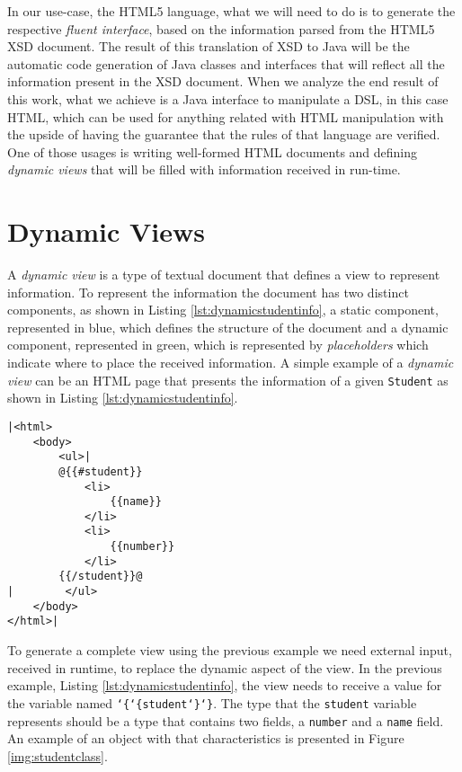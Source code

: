 \noindent
In our use-case, the \ac{HTML}5 language, what we will need to do is to generate the respective \textit{fluent interface}, based on the information parsed from the \ac{HTML}5 \ac{XSD} document. The result of this translation of \ac{XSD} to Java will be the automatic code generation of Java classes and interfaces that will reflect all the information present in the \ac{XSD} document. When we analyze the end result of this work, what we achieve is a Java interface to manipulate a \ac{DSL}, in this case \ac{HTML}, which can be used for anything related with \ac{HTML} manipulation with the upside of having the guarantee that the rules of that language are verified. One of those usages is writing well-formed \ac{HTML} documents and defining \textit{dynamic views} that will be filled with information received in run-time.

\section{Dynamic Views}

A \textit{dynamic view} is a type of textual document that defines a view to represent information. To represent the information the document has two distinct components, as shown in Listing \ref{lst:dynamicstudentinfo}, a {\color{blue}static component}, represented in blue, which defines the structure of the document and a {\color{green}dynamic component}, represented in green, which is represented by \textit{placeholders} which indicate where to place the received information. A simple example of a \textit{dynamic view} can be an \ac{HTML} page that presents the information of a given \texttt{Student} as shown in Listing \ref{lst:dynamicstudentinfo}. 

\bigskip

\begin{minipage}{\linewidth}
\begin{lstlisting}[caption={Dynamic Student Info - Using Mustache Template Engine}, label={lst:dynamicstudentinfo}, style=dynamicviewsex]
|<html>
    <body>
        <ul>|
        @{{#student}}
            <li>
                {{name}}
            </li>
            <li>
                {{number}}
            </li>
        {{/student}}@
|        </ul>
    </body>
</html>|
\end{lstlisting}
\end{minipage} 

\noindent
To generate a complete view using the previous example we need external input, received in runtime, to replace the dynamic aspect of the view. In the previous example, Listing \ref{lst:dynamicstudentinfo}, the view needs to receive a value for the variable named \texttt{\char`\{\char`\{student\char`\}\char`\}}. The type that the \texttt{student} variable represents should be a type that contains two fields, a \texttt{number} and a \texttt{name} field. An example of an object with that characteristics is presented in Figure \ref{img:studentclass}.


